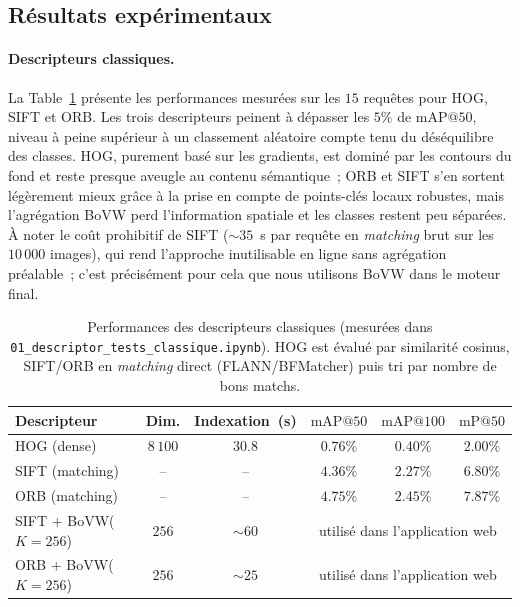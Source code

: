 \documentclass[a4paper,11pt]{article}
\begin{document}
\subsection{Résultats expérimentaux}
\label{subsec:results_part1}

\paragraph{Descripteurs classiques.}
La Table~\ref{tab:classical_results} présente les performances mesurées
sur les $15$ requêtes pour HOG, SIFT et ORB. Les trois descripteurs
peinent à dépasser les $5\%$ de $\text{mAP}@50$, niveau à peine supérieur
à un classement aléatoire compte tenu du déséquilibre des classes. HOG,
purement basé sur les gradients, est dominé par les contours du fond et
reste presque aveugle au contenu sémantique~; ORB et SIFT s'en sortent
légèrement mieux grâce à la prise en compte de points-clés locaux
robustes, mais l'agrégation BoVW perd l'information spatiale et les
classes restent peu séparées. À noter le coût prohibitif de SIFT
($\sim 35$~s par requête en \textit{matching} brut sur les $10\,000$
images), qui rend l'approche inutilisable en ligne sans agrégation
préalable~; c'est précisément pour cela que nous utilisons BoVW dans le
moteur final.

\begin{table}[H]
\centering
\small
\begin{tabular}{lccccc}
\toprule
Descripteur & Dim. & Indexation~(s) & $\text{mAP}@50$ & $\text{mAP}@100$ & $\text{mP}@50$ \\
\midrule
HOG (dense)        & $8\,100$ & $30.8$  & $0.76\%$ & $0.40\%$ & $2.00\%$ \\
SIFT (matching)    & --            & --      & $4.36\%$ & $2.27\%$ & $6.80\%$ \\
ORB (matching)     & --            & --      & $4.75\%$ & $2.45\%$ & $7.87\%$ \\
SIFT + BoVW($K=256$) & $256$       & $\sim 60$ & \multicolumn{3}{c}{utilisé dans l'application web} \\
ORB  + BoVW($K=256$) & $256$       & $\sim 25$ & \multicolumn{3}{c}{utilisé dans l'application web} \\
\bottomrule
\end{tabular}
\caption{Performances des descripteurs classiques (mesurées dans
\texttt{01\_descriptor\_tests\_classique.ipynb}). HOG est évalué par
similarité cosinus, SIFT/ORB en \textit{matching} direct (FLANN/BFMatcher)
puis tri par nombre de bons matchs.}
\label{tab:classical_results}
\end{table}
\end{document}
